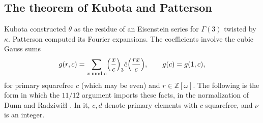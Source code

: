 \documentclass[11pt]{article}
\numberwithin{equation}{section}
\newcommand{\OO}{\mathbb Z[\omega]}
\theoremstyle{definition}
\theoremstyle{remark}
\begin{document}
\subsection{The theorem of Kubota and Patterson}\label{sec:thetathm}
Kubota \cite{Kub69} constructed $\theta$ as the residue of an Eisenstein series for $\Gamma(3)$ twisted by $\kappa$.
Patterson \cite[Theorem~8.1 and Table~III]{Pat77} computed its Fourier expansions. The coefficients involve the
cubic Gauss sums
\begin{equation}\label{eq:grc}
 g(r,c)=\sum_{x\bmod c}\Bigl(\frac xc\Bigr)_3\breve e\Bigl(\frac{rx}c\Bigr),\qquad g(c)=g(1,c),
\end{equation}
for primary squarefree $c$ (which may be even) and $r\in\OO$. The following is the form in which the $11/12$ argument imports these facts, in the
normalization of Dunn and Radziwi\l\l{} \cite[\S5.1 and Appendix]{DR}. In it, $c,d$ denote primary elements with
$c$ squarefree, and $\nu$ is an integer.
\end{document}
